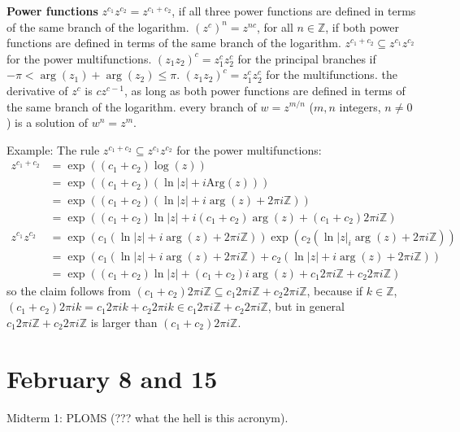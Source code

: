 \documentclass{article}
\theoremstyle{plain}
\theoremstyle{remark}
\newcommand{\Z}{{\mathbb Z}}
\begin{document}
\textbf{Power functions} $z^{c_1}z^{c_2} = z^{c_1 + c_2}$,
if all three power functions are defined in terms of the same branch
of the logarithm.
\newline $(z^c)^n = z^{nc}$, for all $n \in \Z$,
if both power functions are defined in terms of the same branch of the logarithm.
\newline $z^{c_1 + c_2} \subseteq z^{c_1}z^{c_2}$ for the power multifunctions.
\newline $(z_1 z_2)^c = z_1^cz_2^c$ for the principal branches if
$- \pi < \arg(z_1) + \arg(z_2) \leq \pi$.
\newline $(z_1z_2)^c = z_1^cz_2^c$ for the multifunctions.
\newline the derivative of $z^c$ is $cz^{c-1}$,
as long as both power functions are defined in terms of the same branch of the logarithm.
\newline every branch of $w = z^{m/n}$ ($m,n$ integers, $n \neq 0$) is
a solution of $w^n = z^m$.

Example: The rule $z^{c_1 + c_2} \subseteq z^{c_1}z^{c_2}$
for the power multifunctions:
\begin{align*}
	z^{c_1 + c_2}
	&= \exp((c_1 + c_2)\log(z))\\
	&= \exp((c_1 + c_2)(\ln|z| + i\mathrm{Arg}(z)))\\
	&= \exp((c_1 + c_2)(\ln|z| + i\arg(z) + 2\pi i \Z))\\
	&= \exp((c_1 + c_2)\ln|z| + i(c_1 + c_2)\arg(z) + (c_1+c_2)2\pi i \Z)\\
	z^{c_1}z^{c_2}
	&= \exp(c_1(\ln|z| + i\arg(z) + 2\pi i \Z))\exp(c_2(\ln|z| _ i\arg(z) + 2\pi i \Z))\\
	&= \exp(c_1(\ln|z| + i\arg(z) + 2\pi i \Z) + c_2(\ln|z| + i\arg(z) + 2\pi i \Z))\\
	&= \exp((c_1 + c_2) \ln|z| + (c_1 + c_2)i\arg(z)
	+ c_1 2\pi i \Z + c_2 2\pi i \Z)
\end{align*}
so the claim follows from $(c_1 + c_2)2\pi i \Z \subseteq c_1 2\pi i \Z + c_2 2 \pi i \Z$,
because if $k \in \Z$, $(c_1 + c_2)2\pi i k 
= c_1 2\pi i k + c_2 2 \pi i k \in c_1 2\pi i \Z + c_2 2\pi i \Z$,
but in general $c_1 2\pi i \Z + c_2 2\pi i \Z$ is larger than $(c_1 + c_2) 2\pi i \Z$.


\section{February 8 and 15}
Midterm 1: PLOMS (??? what the hell is this acronym).
\end{document}
